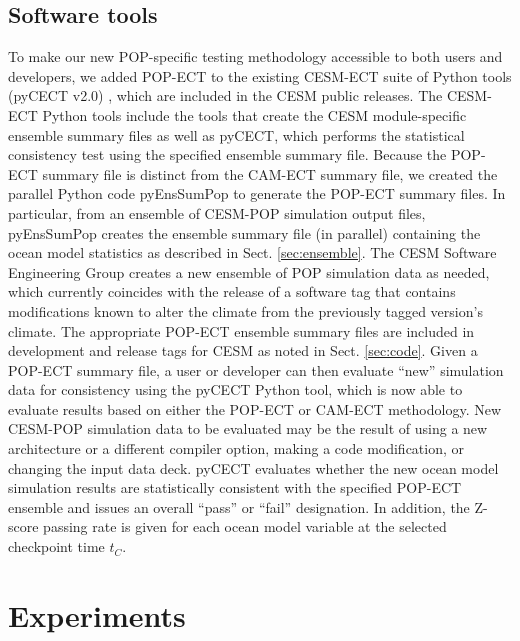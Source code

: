 \documentclass[gmd, manuscript]{copernicus}
\begin{document}
\subsection{Software tools}

To make our new POP-specific testing methodology accessible to both users and developers, we added POP-ECT to the existing CESM-ECT suite of Python tools (pyCECT v2.0) , which are included in the CESM public releases. The CESM-ECT Python tools include the tools that create the CESM module-specific ensemble summary files as well as pyCECT, which performs the statistical consistency test using the specified ensemble summary file.  Because the POP-ECT summary file is distinct from the CAM-ECT summary file, we created the parallel Python code pyEnsSumPop to generate the POP-ECT summary files.  In particular, from an ensemble of CESM-POP simulation output files, pyEnsSumPop creates the ensemble summary file (in parallel) containing the ocean model statistics as described in Sect. \ref{sec:ensemble}.  The CESM Software Engineering Group creates a new ensemble of POP simulation data as needed, which currently coincides with the release of a software tag that contains modifications known to alter the climate from the previously tagged version's climate.  The appropriate POP-ECT ensemble summary files are included in development and release tags for CESM as noted in Sect. \ref{sec:code}.  Given a POP-ECT summary file, a user or developer can then evaluate ``new'' simulation data for consistency using the pyCECT Python tool, which is now able to evaluate results based on either the POP-ECT or CAM-ECT methodology.  New CESM-POP simulation data to be evaluated may be the result of using a new architecture or a different compiler option, making a code modification, or changing the input data deck.  pyCECT evaluates whether the new ocean model simulation results are statistically consistent with the specified POP-ECT ensemble and issues an overall ``pass'' or ``fail'' designation.  In addition, the Z-score passing rate is given for each ocean model variable at the selected checkpoint time $t_C$.


\section{Experiments} \label{sec:exp}
\end{document}
